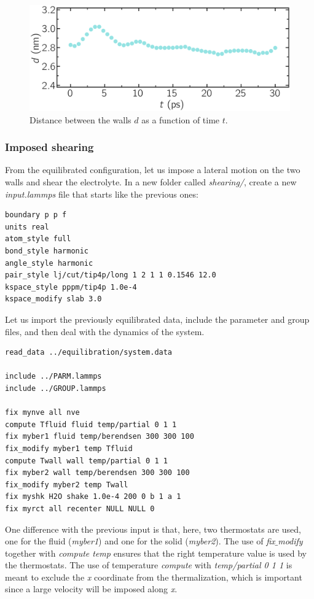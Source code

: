 \documentclass[9pt,tutorial]{livecoms}
\begin{document}
\begin{figure}
\centering
\includegraphics[width=\linewidth]{NANOSHEAR-equilibration}
\caption{Distance between the walls $d$ as a function of time $t$.}
\label{fig:NANOSHEAR-equilibration}
\end{figure}

\subsubsection{Imposed shearing}

From the equilibrated configuration, let us impose a lateral motion on the two walls and shear the electrolyte.
In a new folder called \textit{shearing/}, create a new \textit{input.lammps} file that starts like the previous ones:
{\normalsize \begin{verbatim}
boundary p p f
units real
atom_style full
bond_style harmonic
angle_style harmonic
pair_style lj/cut/tip4p/long 1 2 1 1 0.1546 12.0
kspace_style pppm/tip4p 1.0e-4
kspace_modify slab 3.0
\end{verbatim}}
Let us import the previously equilibrated data, include the parameter and group files, and then deal with the dynamics of the system.
{\normalsize \begin{verbatim}
read_data ../equilibration/system.data

include ../PARM.lammps
include ../GROUP.lammps

fix mynve all nve
compute Tfluid fluid temp/partial 0 1 1
fix myber1 fluid temp/berendsen 300 300 100
fix_modify myber1 temp Tfluid
compute Twall wall temp/partial 0 1 1
fix myber2 wall temp/berendsen 300 300 100
fix_modify myber2 temp Twall
fix myshk H2O shake 1.0e-4 200 0 b 1 a 1
fix myrct all recenter NULL NULL 0
\end{verbatim}}
One difference with the previous input is that, here, two thermostats are used, one for the fluid (\textit{myber1}) and one for the solid (\textit{myber2}). The use of \textit{fix$\_$modify} together with \textit{compute temp} ensures that the right temperature value is used by the thermostats. The use of temperature \textit{compute} with \textit{temp/partial 0 1 1} is meant to exclude the \textit{x} coordinate from the thermalization, which is important since a large velocity will be imposed along \textit{x}. 
\end{document}
